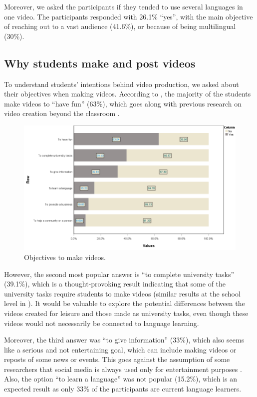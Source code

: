 Moreover, we asked the participants if they tended to use several
languages in one video. The participants responded with 26.1\% ``yes'',
with the main objective of reaching out to a vast audience (41.6\%), or
because of being multilingual (30\%).

\subsection{Why students make and post videos}

To understand students' intentions behind video production, we asked
about their objectives when making videos. According to , the
majority of the students make videos to ``have fun'' (63\%), which goes
along with previous research on video creation beyond the classroom
\cite{zhang2022}.

\begin{figure}[htbp]
\centering
\begin{minipage}{\textwidth}
\includegraphics[width=\textwidth]{Fig-2.png}
\caption{Objectives to make videos.}
\label{fig-02}
\end{minipage}
\end{figure}

However, the second most popular answer is ``to complete university
tasks'' (39.1\%), which is a thought-provoking result indicating that
some of the university tasks require students to make videos (similar
results at the school level in \textcite{cassany2021}). It would be
valuable to explore the potential differences between the videos created
for leisure and those made as university tasks, even though these videos
would not necessarily be connected to language learning.

Moreover, the third answer was ``to give information'' (33\%), which
also seems like a serious and not entertaining goal, which can include
making videos or reposts of some news or events. This goes against the
assumption of some researchers that social media is always used only for
entertainment purposes \textcite{rosyida2019}. Also, the option ``to
learn a language'' was not popular (15.2\%), which is an expected result
as only 33\% of the participants are current language learners.

